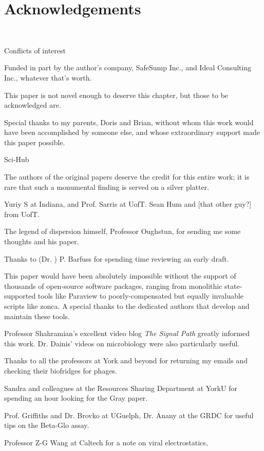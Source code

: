 \documentclass[paper.tex]{subfiles}
\begin{document}
	
\clearpage
\section{Acknowledgements}\

Conflicts of interest

Funded in part by the author's company, SafeSump Inc., and Ideal Consulting Inc., whatever that's worth.

This paper is not novel enough to deserve this chapter, but those to be acknowledged are.

Special thanks to my parents, Doris and Brian, without whom this work would have been accomplished by someone else, and whose extraordinary support made this paper possible.

Sci-Hub

The authors of the original papers deserve the credit for this entire work; it is rare that such a monumental finding is served on a silver platter.

Yuriy S at Indiana, and Prof. Sarris at UofT. Sean Hum and [that other guy?] from UofT.

The legend of dispersion himself, Professor Oughstun, for sending me some thoughts and his paper.

Thanks to (Dr. ) P. Barfuss for spending time reviewing an early draft.

This paper would have been absolutely impossible without the support of thousands of open-source software packages, ranging from monolithic state-supported tools like Paraview to poorly-compensated but equally invaluable scripts like zonca. A special thanks to the dedicated authors that develop and maintain these tools.

Professor Shahramian's excellent video blog {\it The Signal Path} greatly informed this work. Dr. Dainis' videos on microbiology were also particularly useful.

Thanks to all the professors at York and beyond for returning my emails and checking their biofridges for phages.

Sandra and colleagues at the Resources Sharing Department at YorkU for spending an hour looking for 
the Gray paper.

Prof. Griffiths and Dr. Brovko at UGuelph, Dr. Anany at the GRDC for useful tips on the Beta-Glo assay.

Professor Z-G Wang at Caltech for a note on viral electrostatics, 
\end{document}
